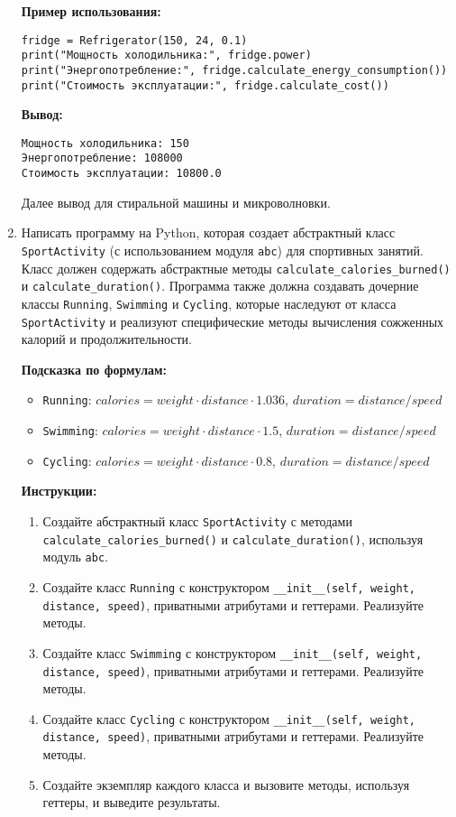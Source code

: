 \begin{enumerate}
\textbf{Пример использования:}
\begin{verbatim}
fridge = Refrigerator(150, 24, 0.1)
print("Мощность холодильника:", fridge.power)
print("Энергопотребление:", fridge.calculate_energy_consumption())
print("Стоимость эксплуатации:", fridge.calculate_cost())
\end{verbatim}

\textbf{Вывод:}
\begin{verbatim}
Мощность холодильника: 150
Энергопотребление: 108000
Стоимость эксплуатации: 10800.0
\end{verbatim}

Далее вывод для стиральной машины и микроволновки.

\item
Написать программу на Python, которая создает абстрактный класс \texttt{SportActivity} (с использованием модуля \texttt{abc}) для спортивных занятий. 
Класс должен содержать абстрактные методы \texttt{calculate\_calories\_burned()} и \texttt{calculate\_duration()}. 
Программа также должна создавать дочерние классы \texttt{Running}, \texttt{Swimming} и \texttt{Cycling}, 
которые наследуют от класса \texttt{SportActivity} и реализуют специфические методы вычисления сожженных калорий и продолжительности.

\textbf{Подсказка по формулам:}
\begin{itemize}
    \item \texttt{Running}: $calories = weight \cdot distance \cdot 1.036$, $duration = distance / speed$
    \item \texttt{Swimming}: $calories = weight \cdot distance \cdot 1.5$, $duration = distance / speed$
    \item \texttt{Cycling}: $calories = weight \cdot distance \cdot 0.8$, $duration = distance / speed$
\end{itemize}

\textbf{Инструкции:}
\begin{enumerate}
    \item Создайте абстрактный класс \texttt{SportActivity} с методами \texttt{calculate\_calories\_burned()} и \texttt{calculate\_duration()}, используя модуль \texttt{abc}.
    \item Создайте класс \texttt{Running} с конструктором \texttt{\_\_init\_\_(self, weight, distance, speed)}, приватными атрибутами и геттерами. Реализуйте методы.
    \item Создайте класс \texttt{Swimming} с конструктором \texttt{\_\_init\_\_(self, weight, distance, speed)}, приватными атрибутами и геттерами. Реализуйте методы.
    \item Создайте класс \texttt{Cycling} с конструктором \texttt{\_\_init\_\_(self, weight, distance, speed)}, приватными атрибутами и геттерами. Реализуйте методы.
    \item Создайте экземпляр каждого класса и вызовите методы, используя геттеры, и выведите результаты.
\end{enumerate}


\end{enumerate}
